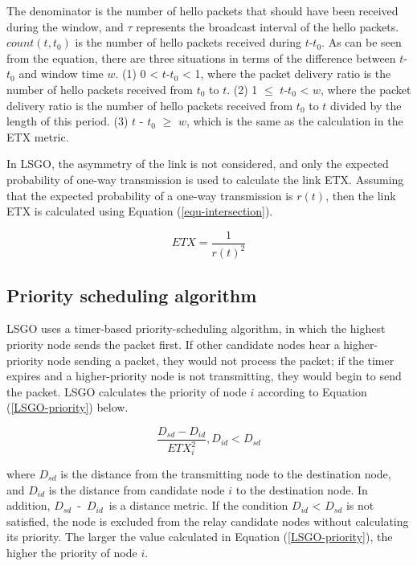 \documentclass[conference]{IEEEtran}
\begin{document}
The denominator is the number of hello packets that should have been received during the window, and $\tau$ represents the broadcast interval of the hello packets. $count(t,t_{0})$ is the number of hello packets received during $t$-$t_{0}$.  
As can be seen from the equation, there are three situations in terms of the difference between $t$-$t_{0}$ and window time $w$. (1) 0 < $t$-$t_{0}$ < 1, where the packet delivery ratio is the number of hello packets received from $t_{0}$ to $t$. (2) 1 $\leq$ $t$-$t_{0}$ < $w$, where the packet delivery ratio is the number of hello packets received from $t_{0}$ to $t$ divided by the length of this period. (3) $t$ - $t_{0}$ $\geq$ $w$, which is the same as the calculation in the ETX metric.

In LSGO, the asymmetry of the link is not considered, and only the expected probability of one-way transmission is used to calculate the link ETX. 
Assuming that the expected probability of a one-way transmission is $r(t)$, then the link ETX is calculated using Equation (\ref{equ-intersection}).
 
 \begin{equation}
 \label{equ-intersection}
 ETX = \frac{1}{  {r(t)}^{2}   } 
 \end{equation}



\subsection{Priority scheduling algorithm}
LSGO uses a timer-based priority-scheduling algorithm, in which the highest priority node sends the packet first. If other candidate nodes hear a higher-priority node sending a packet, they would not process the packet; if the timer expires and a higher-priority node is not transmitting, they would begin to send the packet. LSGO calculates the priority of node $i$ according to Equation (\ref{LSGO-priority}) below.

\begin{equation}
\label{LSGO-priority}
\frac{D_{sd} - D_{id}}{ETX_{i}^{2}} ,   D_{id} < D_{sd}
\end{equation}

where $D_{sd}$ is the distance from the transmitting node to the destination node, and $D_{id}$ is the distance from candidate node $i$ to the destination node. In addition, \mbox{$D_{sd}$ - $D_{id}$ }is a distance metric. If the condition $D_{id}$ < $D_{sd}$ is not satisfied, the node is excluded from the relay candidate nodes without calculating its priority. The larger the value calculated in Equation (\ref{LSGO-priority}), the higher the priority of node $i$. 
\end{document}
